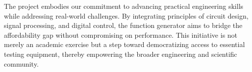 \documentclass[a4paper,12pt]{article}
\begin{document}
The project embodies our commitment to advancing practical engineering skills while addressing real-world challenges. By integrating principles of circuit design, signal processing, and digital control, the function generator aims to bridge the affordability gap without compromising on performance. This initiative is not merely an academic exercise but a step toward democratizing access to essential testing equipment, thereby empowering the broader engineering and scientific community.
\end{document}
